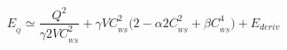 \begin{equation}
E_{_{Q}}\simeq \frac{Q^{2}}{\gamma 2VC_{_{WS}}^{2}}+\gamma
VC_{_{WS}}^{2} \bigl(2-\alpha 2C_{_{WS}}^{2}+\beta
C_{_{WS}}^{4}\bigr)+E_{deriv}
\end{equation}

